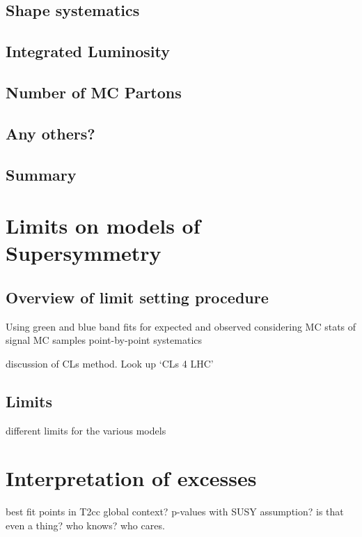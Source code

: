 \subsection{Shape systematics}
\subsection{Integrated Luminosity}
\subsection{Number of MC Partons}
\subsection{Any others?}
\subsection{Summary}

\section{Limits on models of Supersymmetry}  %
\label{sec:interpretation_limits}

\subsection{Overview of limit setting procedure}
Using green and blue band fits for expected and observed
considering MC stats of signal MC samples
point-by-point systematics

discussion of CLs method. Look up `CLs 4 LHC'

\subsection{Limits}
different limits for the various models


\section{Interpretation of excesses}
\label{sec:interpretation_excess}
best fit points in T2cc
global context?
p-values with SUSY assumption? is that even a thing? who knows? who cares.